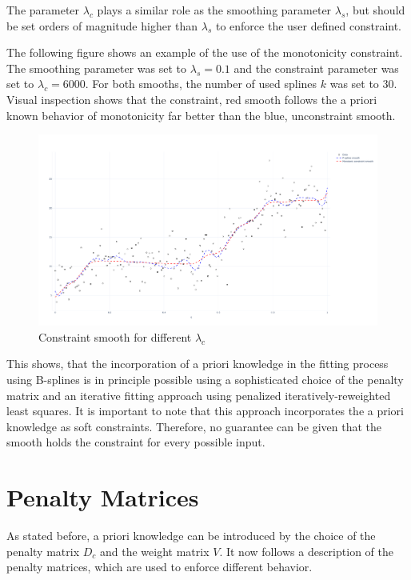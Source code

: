 \documentclass[10pt,a4paper]{article}
\begin{document}
	The parameter $\lambda_c$ plays a similar role as the smoothing parameter $\lambda_s$, but should be set orders of magnitude higher than $\lambda_s$ to enforce the user defined constraint. 
	
	The following figure shows an example of the use of the monotonicity constraint. The smoothing parameter was set to $\lambda_s = 0.1$ and the constraint parameter was set to $\lambda_c = 6000$. For both smooths, the number of used splines $k$ was set to $30$. Visual inspection shows that the constraint, red smooth follows the a priori known behavior of monotonicity far better than the blue, unconstraint smooth.
	
	\begin{figure}[H]
		\centering
		\includegraphics[width=\linewidth]{thesisplots/inc_spline.pdf}
		\caption{Constraint smooth for different $\lambda_c$}
		\label{fig:incspline}
	\end{figure}	

	This shows, that the incorporation of a priori knowledge in the fitting process using B-splines is in principle possible using a sophisticated choice of the penalty matrix and an iterative fitting approach using penalized iteratively-reweighted least squares. It is important to note that this approach incorporates the a priori knowledge as soft constraints. Therefore, no guarantee can be given that the smooth holds the constraint for every possible input. 

						
	\section{Penalty Matrices}
	
	
	As stated before, a priori knowledge can be introduced by the choice of the penalty matrix $D_c$ and the weight matrix $V$. It now follows a description of the penalty matrices, which are used to enforce different behavior. 
	
\end{document}
